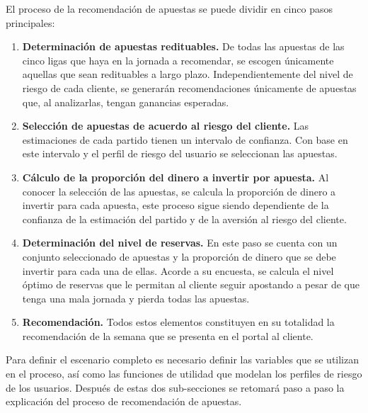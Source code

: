  El proceso de la recomendación de apuestas se puede dividir en cinco pasos principales:

 \begin{enumerate}
 	\item \textbf{Determinación de apuestas redituables.} De todas las apuestas de las cinco ligas que haya en la jornada a recomendar, se escogen únicamente aquellas que sean redituables a largo plazo. Independientemente del nivel de riesgo de cada cliente, se generarán recomendaciones únicamente de apuestas que, al analizarlas, tengan ganancias esperadas.
 	\item \textbf{Selección de apuestas de acuerdo al riesgo del cliente.} Las estimaciones de cada partido tienen un intervalo de confianza. Con base en este intervalo y el perfil de riesgo del usuario se seleccionan las apuestas.
 	\item \textbf{Cálculo de la proporción del dinero a invertir por apuesta.} Al conocer la selección de las apuestas, se calcula la proporción de dinero a invertir para cada apuesta, este proceso sigue siendo dependiente de la confianza de la estimación del partido y de la aversión al riesgo del cliente.
 	\item \textbf{Determinación del nivel de reservas.} En este paso se cuenta con un conjunto seleccionado de apuestas y la proporción de dinero que se debe invertir para cada una de ellas. Acorde a su encuesta, se calcula el nivel óptimo de reservas que le permitan al cliente seguir apostando a pesar de que tenga una mala jornada y pierda todas las apuestas.
 	\item \textbf{Recomendación.} Todos estos elementos constituyen en su totalidad la recomendación de la semana que se presenta en el portal al cliente.
 \end{enumerate}
 
Para definir el escenario completo es necesario definir las variables que se utilizan en el proceso, así como las funciones de utilidad que modelan los perfiles de riesgo de los usuarios. Después de estas dos sub-secciones se retomará paso a paso la explicación del proceso de recomendación de apuestas.
 
